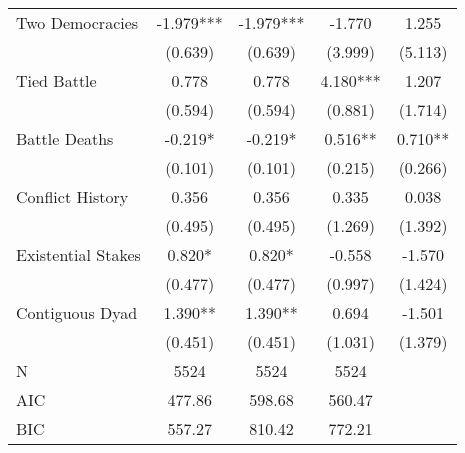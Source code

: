 {\begin{tabular}{l*{4}{c}}
Two Democracies                                             &      -1.979***&      -1.979***&      -1.770   &       1.255   \\
                                                            &     (0.639)   &     (0.639)   &     (3.999)   &     (5.113)   \\
Tied Battle                                                 &       0.778   &       0.778   &       4.180***&       1.207   \\
                                                            &     (0.594)   &     (0.594)   &     (0.881)   &     (1.714)   \\
Battle Deaths                                               &      -0.219*  &      -0.219*  &       0.516** &       0.710** \\
                                                            &     (0.101)   &     (0.101)   &     (0.215)   &     (0.266)   \\
Conflict History                                            &       0.356   &       0.356   &       0.335   &       0.038   \\
                                                            &     (0.495)   &     (0.495)   &     (1.269)   &     (1.392)   \\
Existential Stakes                                          &       0.820*  &       0.820*  &      -0.558   &      -1.570   \\
                                                            &     (0.477)   &     (0.477)   &     (0.997)   &     (1.424)   \\
Contiguous Dyad                                             &       1.390** &       1.390** &       0.694   &      -1.501   \\
                                                            &     (0.451)   &     (0.451)   &     (1.031)   &     (1.379)   \\
\midrule
N                                                           &        5524   &        5524   &        5524   &               \\
AIC                                                         &      477.86   &      598.68   &      560.47   &               \\
BIC                                                         &      557.27   &      810.42   &      772.21   &               \\
\bottomrule
\end{tabular}
}
